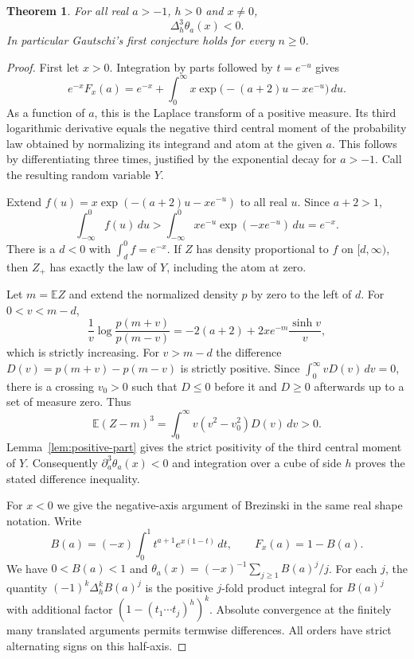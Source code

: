 \documentclass[11pt,a4paper]{article}
\newtheorem{theorem}{Theorem}[section]
\begin{document}
\begin{theorem}\label{thm:gautschi}
For all real $a>-1$, $h>0$ and $x\ne0$,
\[
 \Delta_h^3\theta_a(x)<0.
\]
In particular Gautschi's first conjecture holds for every $n\ge0$.
\end{theorem}
\begin{proof}
First let $x>0$. Integration by parts followed by $t=e^{-u}$ gives
\[
 e^{-x}F_x(a)=e^{-x}
    +\int_0^\infty x\exp\bigl(-(a+2)u-xe^{-u}\bigr)\,du.
\]
As a function of $a$, this is the Laplace transform of a positive
measure. Its third logarithmic derivative equals the negative third
central moment of the probability law obtained by normalizing its
integrand and atom at the given $a$. This follows by differentiating
three times, justified by the exponential decay for $a>-1$.
Call the resulting random variable $Y$.

Extend $f(u)=x\exp(-(a+2)u-xe^{-u})$ to all real $u$.
Since $a+2>1$,
\[
 \int_{-\infty}^0 f(u)\,du
 >\int_{-\infty}^0 xe^{-u}\exp(-xe^{-u})\,du=e^{-x}.
\]
There is a $d<0$ with $\int_d^0 f=e^{-x}$. If $Z$ has density
proportional to $f$ on $[d,\infty)$, then $Z_+$ has exactly the law
of $Y$, including the atom at zero.

Let $m=\mathbb E Z$ and extend the normalized density $p$ by zero
to the left of $d$. For $0<v<m-d$,
\[
 \frac{1}{v}\log\frac{p(m+v)}{p(m-v)}
 =-2(a+2)+2xe^{-m}\frac{\sinh v}{v},
\]
which is strictly increasing. For $v>m-d$ the difference
$D(v)=p(m+v)-p(m-v)$ is strictly positive. Since
$\int_0^\infty vD(v)\,dv=0$, there is a crossing $v_0>0$ such
that $D\le0$ before it and $D\ge0$ afterwards up to a set of
measure zero. Thus
\[
 \mathbb E(Z-m)^3=\int_0^\infty v(v^2-v_0^2)D(v)\,dv>0.
\]
Lemma~\ref{lem:positive-part} gives the strict positivity of the
third central moment of $Y$. Consequently
$\partial_a^3\theta_a(x)<0$ and integration over a cube of side
$h$ proves the stated difference inequality.

For $x<0$ we give the negative-axis argument of Brezinski
\cite{brezinski} in the same real shape notation. Write
\[
 B(a)=(-x)\int_0^1 t^{a+1}e^{x(1-t)}\,dt,\qquad F_x(a)=1-B(a).
\]
We have $0<B(a)<1$ and
$\theta_a(x)=(-x)^{-1}\sum_{j\ge1} B(a)^j/j$.
For each $j$, the quantity $(-1)^k\Delta_h^k B(a)^j$ is the
positive $j$-fold product integral for $B(a)^j$ with additional
factor $(1-(t_1\cdots t_j)^h)^k$. Absolute convergence at the
finitely many translated arguments permits termwise differences.
All orders have strict alternating signs on this half-axis.
\end{proof}
\end{document}
